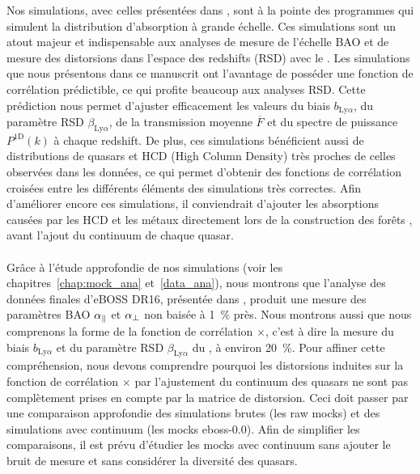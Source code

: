 \documentclass[11pt, twoside, a4paper, openright]{report}
\begin{document}
Nos simulations, avec celles présentées dans \textcite{Farr2019}, sont à la pointe des programmes qui simulent la distribution d'absorption \lya{} à grande échelle. Ces simulations sont un atout majeur et indispensable aux analyses de mesure de l'échelle BAO et de mesure des distorsions dans l'espace des redshifts (RSD) avec le \lya{}. Les simulations que nous présentons dans ce manuscrit ont l'avantage de posséder une fonction de corrélation prédictible, ce qui profite beaucoup aux analyses RSD.
Cette prédiction nous permet d'ajuster efficacement les valeurs du biais $b_{\mathrm{Ly}\alpha}$, du paramètre RSD $\beta_{\mathrm{Ly}\alpha}$, de la transmission moyenne $\overline F$ et du spectre de puissance $P^{\mathrm{1D}}(k)$ à chaque redshift.
De plus, ces simulations bénéficient aussi de distributions de quasars et HCD (High Column Density) très proches de celles observées dans les données, ce qui permet d'obtenir des fonctions de corrélation croisées entre les différents éléments des simulations très correctes. Afin d'améliorer encore ces simulations, il conviendrait d'ajouter les absorptions causées par les HCD et les métaux directement lors de la construction des forêts \lya{}, avant l'ajout du continuum de chaque quasar.



\paragraph{}
Grâce à l'étude approfondie de nos simulations (voir les chapitres~\ref{chap:mock_ana} et~\ref{data_ana}), nous montrons que l'analyse des données finales d'eBOSS DR16, présentée dans \textcite{DuMasdesBourboux2020}, produit une mesure des paramètres BAO $\alpha_{\parallel}{}$ et $\alpha_{\perp}{}$ non baisée à \SI{1}{\percent} près.
Nous montrons aussi que nous comprenons la forme de la fonction de corrélation \lya{}$\times$\lya{}, c'est à dire la mesure du biais $b_{\mathrm{Ly}\alpha}$ et du paramètre RSD $\beta_{\mathrm{Ly}\alpha}$ du \lya{}, à environ \SI{20}{\percent}.
Pour affiner cette compréhension, nous devons comprendre pourquoi les distorsions induites sur la fonction de corrélation \lya{}$\times$\lya{} par l'ajustement du continuum des quasars ne sont pas complètement prises en compte par la matrice de distorsion.
Ceci doit passer par une comparaison approfondie des simulations brutes (les raw mocks) et des simulations avec continuum (les mocks eboss-0.0). Afin de simplifier les comparaisons, il est prévu d'étudier les mocks avec continuum sans ajouter le bruit de mesure et sans considérer la diversité des quasars.
\end{document}
